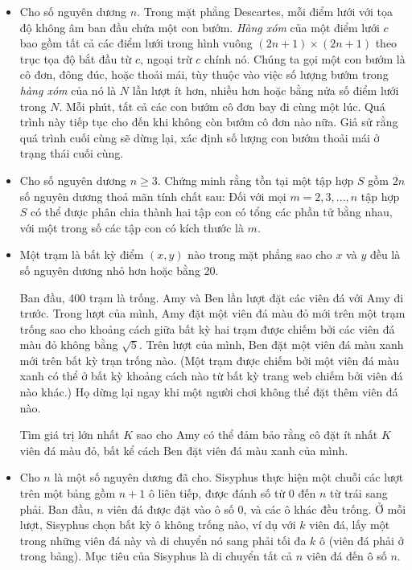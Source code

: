 \documentclass[11pt]{scrartcl}
\begin{document}
\begin{itemize}[label=, leftmargin=0em, itemsep=-0em]
    \item \begin{btvn}
        Cho số nguyên dương $n$. Trong mặt phẳng Descartes, mỗi điểm lưới với tọa độ không âm ban đầu chứa một con bướm. \textit{Hàng xóm} của một điểm lưới $c$ bao gồm tất cả các điểm lưới trong hình vuông $(2n+1) \times (2n+1)$ theo trục tọa độ bắt đầu từ $c$, ngoại trừ $c$ chính nó. Chúng ta gọi một con bướm là cô đơn, đông đúc, hoặc thoải mái, tùy thuộc vào việc số lượng bướm trong \textit{hàng xóm} của nó là $N$ lần lượt ít hơn, nhiều hơn hoặc bằng nửa số điểm lưới trong $N$. Mỗi phút, tất cả các con bướm cô đơn bay đi cùng một lúc. Quá trình này tiếp tục cho đến khi không còn bướm cô đơn nào nữa. Giả sử rằng quá trình cuối cùng sẽ dừng lại, xác định số lượng con bướm thoải mái ở trạng thái cuối cùng.
    \end{btvn}
    
    \item \begin{btvn}
        Cho số nguyên dương $n\geqslant 3$. Chứng minh rằng tồn tại một tập hợp $S$ gồm $2n$ số nguyên dương thoả mãn tính chất sau: Đối với mọi $m=2,3,...,n$ tập hợp $S$ có thể được phân chia thành hai tập con có tổng các phần tử bằng nhau, với một trong số các tập con có kích thước là $m$.
    \end{btvn}

    \item \begin{btvn}
        Một trạm là bất kỳ điểm $(x, y)$ nào trong mặt phẳng sao cho $x$ và $y$ đều là số nguyên dương nhỏ hơn hoặc bằng 20.

        Ban đầu, 400 trạm là trống. Amy và Ben lần lượt đặt các viên đá với Amy đi trước. Trong lượt của mình, Amy đặt một viên đá màu đỏ mới trên một trạm trống sao cho khoảng cách giữa bất kỳ hai trạm được chiếm bởi các viên đá màu đỏ không bằng $\sqrt{5}$. Trên lượt của mình, Ben đặt một viên đá màu xanh mới trên bất kỳ trạn trống nào. (Một trạm được chiếm bởi một viên đá màu xanh có thể ở bất kỳ khoảng cách nào từ bất kỳ trang web chiếm bởi viên đá nào khác.) Họ dừng lại ngay khi một người chơi không thể đặt thêm viên đá nào.
        
        Tìm giá trị lớn nhất $K$ sao cho Amy có thể đảm bảo rằng cô đặt ít nhất $K$ viên đá màu đỏ, bất kể cách Ben đặt viên đá màu xanh của mình.
    \end{btvn}

    \item \begin{btvn}
        Cho $n$ là một số nguyên dương đã cho. Sisyphus thực hiện một chuỗi các lượt trên một bảng gồm $n + 1$ ô liên tiếp, được đánh số từ $0$ đến $n$ từ trái sang phải. Ban đầu, $n$ viên đá được đặt vào ô số $0$, và các ô khác đều trống. Ở mỗi lượt, Sisyphus chọn bất kỳ ô không trống nào, ví dụ với $k$ viên đá, lấy một trong những viên đá này và di chuyển nó sang phải tối đa $k$ ô (viên đá phải ở trong bảng). Mục tiêu của Sisyphus là di chuyển tất cả $n$ viên đá đến ô số $n$.


\end{btvn}
\end{itemize}
\end{document}
